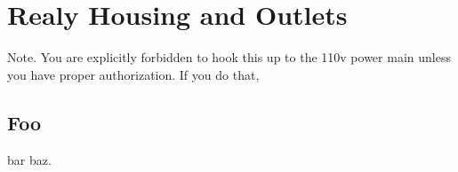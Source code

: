 \documentclass{article} \usepackage{multicol}
\begin{document}
\section{Realy Housing and Outlets}
Note. You are explicitly forbidden to hook this up to the 110v power
main unless you have proper authorization.  If you do that,
\begin{multicols}{2}
  \subsection{Foo}
  bar baz.
\end{multicols}
\end{document}
